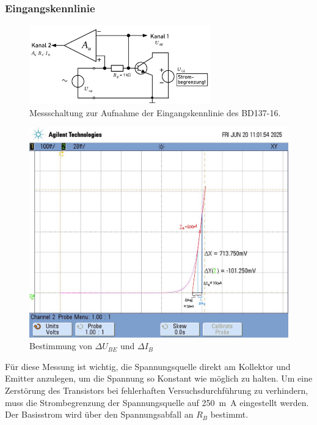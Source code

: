 \documentclass[
	a4paper, %
	12pt, %
]{CSUniSchoolLabReport}
\newcommand{\milli}{m}
\begin{document}
\subsubsection{Eingangskennlinie}
\begin{figure}[h]
	\centering
	\includegraphics[width=0.7\textwidth]{Figures/MessschaltungEingangskennlinie.png}
	\caption{Messschaltung zur Aufnahme der Eingangskennlinie des BD137-16.}
	\label{fig:MessschaltungEingangskennlinie}
\end{figure}
\begin{figure}[H]
	\centering
	\includegraphics[width=1\textwidth]{Figures/Eingangskennlinie.jpg}
	\caption{Bestimmung von $\Delta U_{BE}$ und $\Delta I_B$}
	\label{fig:Eingangskennlinie}
\end{figure}



Für diese Messung ist wichtig, die Spannungsquelle direkt am Kollektor und Emitter anzulegen, um die Spannung so Konstant wie möglich zu halten.
Um eine Zerstörung des Transistors bei fehlerhaften Versuchsdurchführung zu verhindern, muss die Strombegrenzung der Spannungsquelle auf \SI{250}{\milli\ampere} eingestellt werden. 
Der Basisstrom wird über den Spannungsabfall an $R_B$ bestimmt.
\end{document}
